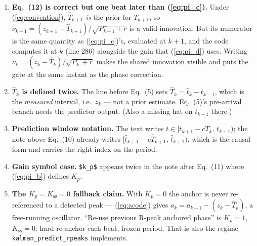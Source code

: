 \documentclass[11pt]{article}
\newcommand{\Th}{\widehat{T}}
\newcommand{\tht}{\widehat{t}}
\newcommand{\code}[1]{\texttt{\small #1}}
\begin{document}
\begin{enumerate}[leftmargin=1.4em]
\item \textbf{Eq.~(12) is correct but one beat later than (\ref{eq:pi_c}).} Under
(\ref{eq:convention}), $\Th_{k+1}$ \emph{is} the prior for $T_{k+1}$, so
$\nu_{k+1}=(z_{k+1}-\Th_{k+1})/\sqrt{P_{k+1}^-+r}$ is a valid innovation. But its numerator
is the same quantity as (\ref{eq:pi_c})'s, evaluated at $k+1$, and the code computes it at $k$
(line 286) alongside the gain that (\ref{eq:pi_d}) uses. Writing
$\nu_k=(z_k-\Th_k)/\sqrt{P_k^-+r}$ makes the shared innovation visible and puts the gate at
the same instant as the phase correction.

\item \textbf{$\Th_k$ is defined twice.} The line before Eq.~(5) sets
$\Th_k=\tht_k-t_{k-1}$, which is the \emph{measured} interval, i.e.\ $z_k$ --- not a prior
estimate. Eq.~(5)'s pre-arrival branch needs the predictor output. (Also a missing hat on
$t_{k-1}$ there.)

\item \textbf{Prediction window notation.} The text writes
$t\in[t_{k+1}-cT_k,\,t_{k+1})$; the note above Eq.~(10) already writes
$[\tht_{k+1}-c\Th_{k+1},\,\tht_{k+1})$, which is the causal form and carries the right index on
the period.

\item \textbf{Gain symbol case.} \code{\$k\_p\$} appears twice in the note after Eq.~(11)
where (\ref{eq:pi_b}) defines $K_p$.

\item \textbf{The $K_p{=}K_{\mathrm{ss}}{=}0$ fallback claim.} With $K_p=0$ the anchor is
never re-referenced to a detected peak --- (\ref{eq:acode}) gives $a_k=a_{k-1}-(z_k-\Th_k)$,
a free-running oscillator. ``Re-use previous R-peak anchored phase'' is $K_p=1$,
$K_{\mathrm{ss}}=0$: hard re-anchor each beat, frozen period. That is also the regime
\code{kalman\_predict\_rpeaks} implements.
\end{enumerate}
\end{document}
